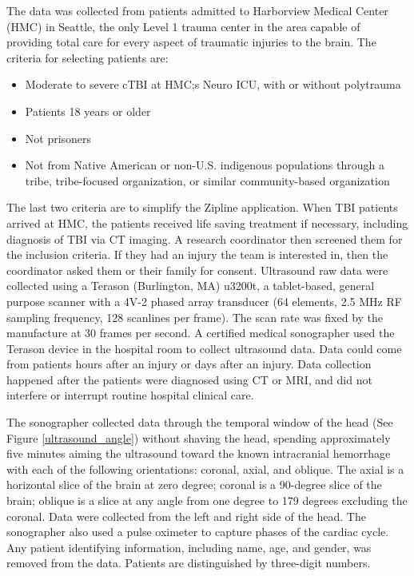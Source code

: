 \documentclass [11pt, proquest] {uwthesis}[2020/02/24]
\begin{document}
The data was collected from patients admitted to Harborview Medical Center (HMC) in Seattle, the only Level 1 trauma 
center in the area capable of providing total care for every aspect of traumatic injuries to the brain\cite{trauma_care}.
The criteria for selecting patients are:
\begin{itemize}
  \item Moderate to severe cTBI at HMC;s Neuro ICU, with or without polytrauma
  \item Patients 18 years or older
  \item Not prisoners
  \item Not from Native American or non-U.S. indigenous populations through a tribe, tribe-focused organization, or similar community-based organization
\end{itemize}
The last two criteria are to simplify the Zipline application.
When TBI patients arrived at HMC, the patients received life saving treatment if necessary, including diagnosis of TBI via CT imaging.
A research coordinator then screened them for the inclusion criteria. If they had an injury the team is interested in, then 
the coordinator asked them or their family for consent. Ultrasound raw data were collected using a Terason (Burlington, MA) u3200t, a tablet-based, 
general purpose scanner with a 4V-2 phased array transducer (64 elements, 2.5 MHz RF sampling frequency, 128 scanlines
per frame). The scan rate was fixed by the manufacture at 30 frames per second. A certified medical sonographer used the Terason 
device in the hospital room to collect ultrasound data. Data could come from patients hours after an injury or days after 
an injury. Data collection happened after the patients were diagnosed using CT or MRI, and did not interfere or interrupt 
routine hospital clinical care.

The sonographer collected data through the temporal window of the head (See Figure \ref{ultrasound_angle}) without
shaving the head, spending approximately five minutes aiming the ultrasound toward the known intracranial hemorrhage with 
each of the following orientations: coronal, axial, and oblique. The axial is a horizontal slice of the brain at zero degree; 
coronal is a 90-degree slice of the brain; oblique is a slice at any angle from one degree to 179 degrees excluding the coronal. 
Data were collected from the left and right side of the head. The sonographer also used a pulse oximeter to capture
phases of the cardiac cycle. Any patient identifying information, including name, age, and gender, was removed from the data. 
Patients are distinguished by three-digit numbers.
\end{document}
